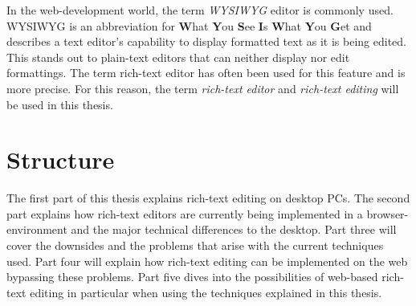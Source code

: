 In the web-development world, the term \textit{WYSIWYG} editor is commonly used. WYSIWYG is an abbreviation for \textbf{W}hat \textbf{Y}ou \textbf{S}ee \textbf{I}s \textbf{W}hat \textbf{Y}ou \textbf{G}et and describes a text editor's capability to display formatted text as it is being edited. This stands out to plain-text editors that can neither display nor edit formattings. The term rich-text editor has often been used for this feature and is more precise. For this reason, the term \textit{rich-text editor} and \textit{rich-text editing} will be used in this thesis.


\section{Structure}

The first part of this thesis explains rich-text editing on desktop PCs. The second part explains how rich-text editors are currently being implemented in a browser-environment and the major technical differences to the desktop. Part three will cover the downsides and the problems that arise with the current techniques used. Part four will explain how rich-text editing can be implemented on the web bypassing these problems. Part five dives into the possibilities of web-based rich-text editing in particular when using the techniques explained in this thesis.


